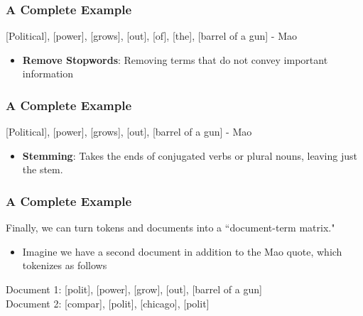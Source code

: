 \documentclass[compress, aspectratio=54]{beamer}
\begin{document}

\begin{frame}
\frametitle{A Complete Example}
[Political], [power], [grows], [out], {\color{red} [of], [the],} [barrel of a gun] - Mao
\begin{itemize}

\item \textbf{Remove Stopwords}: Removing terms that do not convey important information
\end{itemize}

\end{frame}

\begin{frame}
\frametitle{A Complete Example}
[Polit{\color{red}ical}], [power], [grow{\color{red}s}], [out], [barrel of a gun] - Mao
\begin{itemize}

\item \textbf{Stemming}: Takes the ends of conjugated verbs or plural nouns, leaving just the stem.
\end{itemize}
\end{frame}


\begin{frame}
\frametitle{A Complete Example}
Finally, we can turn tokens and documents into a ``document-term
matrix."
\begin{itemize}
\item Imagine we have a second document in addition to the Mao quote, which
tokenizes as follows
\end{itemize}

Document 1: [polit], [power], [grow], [out], [barrel of a gun] \\
Document 2: [compar], [polit], [chicago], [polit]\\

\end{frame}


\end{document}
